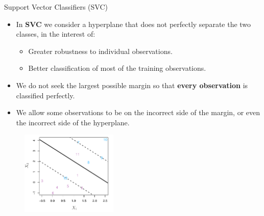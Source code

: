\begin{frame}{Support Vector Classifiers (SVC)}

\begin{itemize}
    \item In \textbf{SVC} we consider a hyperplane that does not perfectly separate the two classes, in the interest of: \pause 

    \begin{itemize}
        \item[\checkmark] Greater robustness to individual observations. \pause 

        \item[\checkmark] Better classification of most of the training observations. \pause 
    \end{itemize}

    \item We do not seek the largest possible margin so that \textbf{every observation} is classified perfectly. \pause 
    
    \item We allow some observations to be on the incorrect side of the margin, or even the incorrect side of the hyperplane. \pause 
\end{itemize}

\begin{figure}
    \centering
    \includegraphics[height=4cm]{svc/soft-margin.png}
\end{figure}
    
\end{frame}
